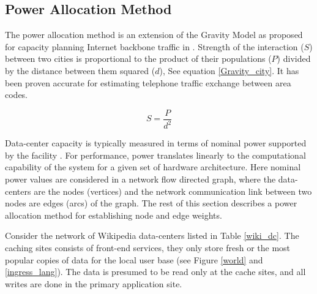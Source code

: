 \documentclass[conference]{IEEEtran}
\begin{document}







\subsection{Power Allocation Method}

The power allocation method is an extension of the Gravity Model as proposed for capacity planning Internet backbone traffic in \cite{Gravity}. Strength of the interaction ($S$) between two cities is proportional to the product of their populations ($P$) divided by the distance between them squared ($d$), See equation \ref{Gravity_city}. It has been proven accurate for estimating telephone traffic exchange between area codes. 

\begin{equation}
\label{Gravity_city}
S = \frac{P}{d^2}
\end{equation}

Data-center capacity is typically measured in terms of nominal power supported by the facility \cite{wsc}. For performance, power translates linearly to the computational capability of the system for a given set of hardware architecture. Here nominal power values are considered in a network flow directed graph, where the data-centers are the nodes (vertices) and the network communication link between two nodes are edges (arcs) of the graph. The rest of this section describes a power allocation method for establishing node and edge weights.

Consider the network of Wikipedia data-centers listed in Table \ref{wiki_dc}. The caching sites consists of front-end services,  they only store fresh or the most popular copies of data for the local user base (see Figure \ref{world} and \ref{ingress_lang}). The data is presumed to be read only at the cache sites, and all writes are done in the primary application site. 
\end{document}
